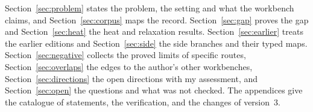 Section~\ref{sec:problem} states the problem, the setting and what the workbench claims, and Section~\ref{sec:corpus} maps the record. Section~\ref{sec:gap} proves the gap and Section~\ref{sec:heat} the heat and relaxation results. Section~\ref{sec:earlier} treats the earlier editions and Section~\ref{sec:side} the side branches and their typed maps. Section~\ref{sec:negative} collects the proved limits of specific routes, Section~\ref{sec:overlaps} the edges to the author's other workbenches, Section~\ref{sec:directions} the open directions with my assessment, and Section~\ref{sec:open} the questions and what was not checked. The appendices give the catalogue of statements, the verification, and the changes of version~3.
